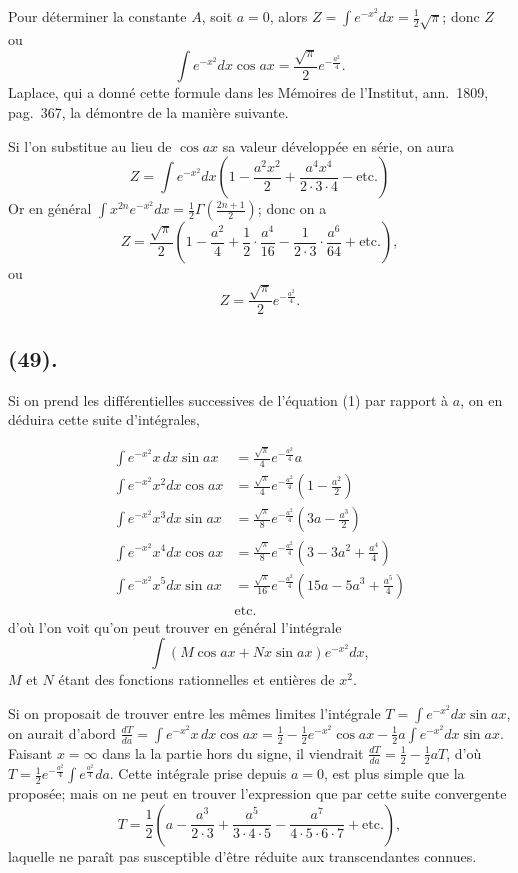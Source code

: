 \documentclass{article}
\begin{document}
Pour déterminer la constante $A$, soit $a=0$, alors $\displaystyle Z=\int e^{-x^{2}}dx=\tfrac{1}{2}\sqrt{\pi}$; donc $Z$ ou
\[ \int e^{-x^{2}}dx\cos ax=\frac{\sqrt{\pi}}{2}e^{-\frac{a^{2}}{4}}. \tag{1} \]
Laplace, qui a donné cette formule dans les Mémoires de l'Institut, ann.\ 1809, pag.\ 367, la démontre de la manière suivante.

Si l'on substitue au lieu de $\cos ax$ sa valeur développée en série, on aura
\[ Z=\int e^{-x^{2}}dx\left(1-\frac{a^{2}x^{2}}{2}+\frac{a^{4}x^{4}}{2\cdot3\cdot4}-\text{etc.}\right) \]
Or en général $\displaystyle\int x^{2n}e^{-x^{2}}dx=\tfrac{1}{2}\Gamma\left(\frac{2n+1}{2}\right)$; donc on a
\[ Z=\frac{\sqrt{\pi}}{2}\left(1-\frac{a^{2}}{4}+\frac{1}{2}\cdot\frac{a^{4}}{16}-\frac{1}{2\cdot3}\cdot\frac{a^{6}}{64}+\text{etc.}\right), \]
ou
\[ Z=\frac{\sqrt{\pi}}{2}e^{-\frac{a^{2}}{4}}. \]

\subsection*{(49).}

Si on prend les différentielles successives de l'équation (1) par rapport à $a$, on en déduira cette suite d'intégrales,

\[ \begin{aligned} \int e^{-x^{2}}x\,dx\sin ax&=\frac{\sqrt{\pi}}{4}e^{-\frac{a^{2}}{4}}a\\ \int e^{-x^{2}}x^{2}dx\cos ax&=\frac{\sqrt{\pi}}{4}e^{-\frac{a^{2}}{4}}\left(1-\frac{a^{2}}{2}\right)\\ \int e^{-x^{2}}x^{3}dx\sin ax&=\frac{\sqrt{\pi}}{8}e^{-\frac{a^{2}}{4}}\left(3a-\frac{a^{3}}{2}\right)\\ \int e^{-x^{2}}x^{4}dx\cos ax&=\frac{\sqrt{\pi}}{8}e^{-\frac{a^{2}}{4}}\left(3-3a^{2}+\frac{a^{4}}{4}\right)\\ \int e^{-x^{2}}x^{5}dx\sin ax&=\frac{\sqrt{\pi}}{16}e^{-\frac{a^{2}}{4}}\left(15a-5a^{3}+\frac{a^{5}}{4}\right)\\ &\text{etc.} \end{aligned} \tag{2} \]
d'où l'on voit qu'on peut trouver en général l'intégrale
\[ \int(M\cos ax+Nx\sin ax)e^{-x^{2}}dx, \]
$M$ et $N$ étant des fonctions rationnelles et entières de $x^{2}$.

Si on proposait de trouver entre les mêmes limites l'intégrale $\displaystyle T=\int e^{-x^{2}}dx\sin ax$, on aurait d'abord $\displaystyle\frac{dT}{da}=\int e^{-x^{2}}x\,dx\cos ax=\tfrac{1}{2}-\tfrac{1}{2}e^{-x^{2}}\cos ax-\tfrac{1}{2}a\int e^{-x^{2}}dx\sin ax$. Faisant $x=\infty$ dans la la partie hors du signe, il viendrait $\frac{dT}{da}=\frac{1}{2}-\frac{1}{2}aT$, d'où $\displaystyle T=\tfrac{1}{2}e^{-\frac{a^{2}}{4}}\int e^{\frac{a^{2}}{4}}da$. Cette intégrale prise depuis $a=0$, est plus simple que la proposée; mais on ne peut en trouver l'expression que par cette suite convergente
\[ T=\frac{1}{2}\left(a-\frac{a^{3}}{2\cdot3}+\frac{a^{5}}{3\cdot4\cdot5}-\frac{a^{7}}{4\cdot5\cdot6\cdot7}+\text{etc.}\right), \]
laquelle ne paraît pas susceptible d'être réduite aux transcendantes connues.
\end{document}
